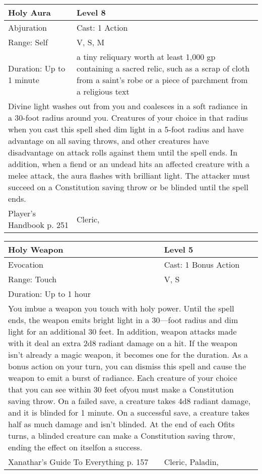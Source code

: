 \documentclass[11pt]{report}
\begin{document}
\begin{table}[H]
	\begin{tabular}{||p{6cm}|p{6cm}||}
		\hline\hline
		\bf{Holy Aura} & Level 8\\ \hline
		Abjuration & Cast: 1 Action\\ \hline
		Range: Self & V, S, M\\ \hline
		Duration: Up to 1 minute & a tiny reliquary worth at least 1,000 gp containing a sacred relic, such as a scrap of cloth from a saint’s robe or a piece of parchment from a religious text\\ \hline
		\multicolumn{2}{||p{12cm}||}{Divine light washes out from you and coalesces in a soft radiance in a 30-foot radius around you.
Creatures of your choice in that radius when you cast this spell shed dim light in a 5-foot radius and have advantage on all saving throws, and other creatures have disadvantage on attack rolls against them until the spell ends. In addition, when a fiend or an undead hits an affected creature with a melee attack, the aura flashes with brilliant light. The attacker must succeed on a Constitution saving throw or be blinded until the spell ends.}\\ \hline
Player's Handbook p. 251 & Cleric, \\ \hline\hline
	\end{tabular}
\end{table}

\begin{table}[H]
	\begin{tabular}{||p{6cm}|p{6cm}||}
		\hline\hline
		\bf{Holy Weapon} & Level 5\\ \hline
		Evocation & Cast: 1 Bonus Action\\ \hline
		Range: Touch & V, S\\ \hline
		Duration: Up to 1 hour & \\ \hline
		\multicolumn{2}{||p{12cm}||}{You imbue a weapon you touch with holy power. Until the spell ends, the weapon emits bright light in a 30—foot radius and dim light for an additional 30 feet. In addition, weapon attacks made with it deal an extra 2d8 radiant damage on a hit. If the weapon isn’t already a magic weapon, it becomes one for the duration. As a bonus action on your turn, you can dismiss this spell and cause the weapon to emit a burst of radiance. Each creature of your choice that you can see within 30 feet ofyou must make a Constitution saving throw. On a failed save, a creature takes 4d8 radiant damage, and it is blinded for 1 minute. On a successful save, a creature takes half as much damage and isn’t blinded. At the end of each Ofits turns, a blinded creature can make a Constitution saving throw, ending the effect on itselfon a success.}\\ \hline
Xanathar's Guide To Everything p. 157 & Cleric, Paladin, \\ \hline\hline
	\end{tabular}
\end{table}
\end{document}
